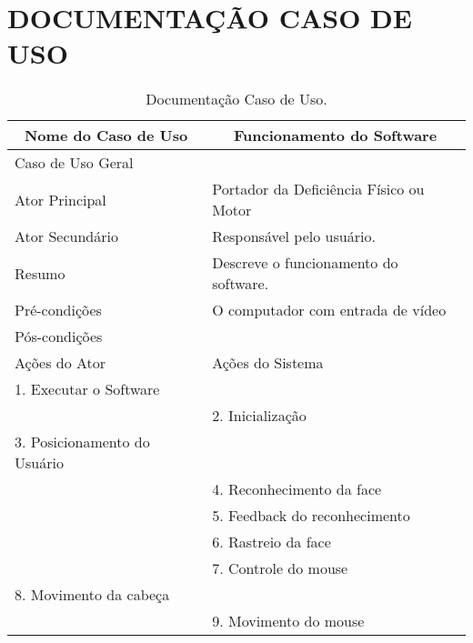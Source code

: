 \chapter{DOCUMENTAÇÃO CASO DE USO}
\label{Apx:A}


\begin{longtable}{|l|l|}
\caption{Documentação Caso de Uso.} \label{tab:long} \\

\hline 
\multicolumn{1}{|c|}{\textbf{Nome do Caso de Uso}} & 
\multicolumn{1}{c|}{\textbf{Funcionamento do Software}} \\ \hline 
\endfirsthead

\hline
Caso de Uso Geral &  \\ \hline
Ator Principal & Portador da Deficiência Físico ou Motor \\ \hline
Ator Secundário & Responsável pelo usuário. \\ \hline
Resumo & Descreve o funcionamento do software. \\ \hline 
Pré-condições &  O computador com entrada de vídeo \\ \hline 
 Pós-condições&  \\ \hline
 Ações do Ator& Ações do Sistema \\ \hline
 1.	Executar o Software&  \\ \hline
 &  2.	Inicialização\\ \hline
 3.	Posicionamento do Usuário&  \\ \hline
 & 4.	Reconhecimento da face  \\ \hline
 & 5.	Feedback do reconhecimento \\ \hline
 & 6.	Rastreio da face \\ \hline
 & 7.	Controle do mouse \\ \hline
8.	Movimento da cabeça &  \\ \hline
 &  9.	Movimento do mouse\\ \hline
\end{longtable}


